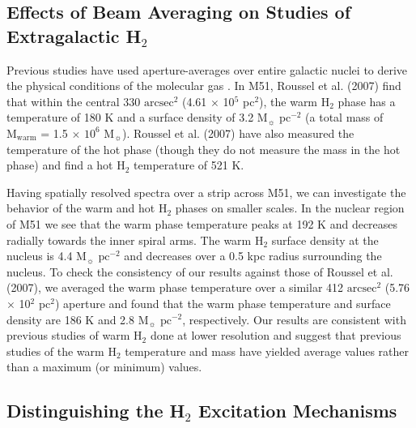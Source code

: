 \documentclass[12pt,preprint]{aastex}
\begin{document}
\subsection{Effects of Beam Averaging on Studies of Extragalactic H$_2$}

Previous studies have used aperture-averages over entire galactic
nuclei to derive the physical conditions of the molecular gas
\citep{rig02, hig06, rou07}.  In M51, Roussel et al. (2007) find that within
the central 330 $\mathrm{arcsec^2}$ (4.61 $\times$ 10$^5$ pc$^2$),
the warm H$_2$ phase has a temperature of 180 K and 
a surface density of 3.2 $\mathrm{M_\sun}$ $\mathrm{pc^{-2}}$ 
(a total mass of $\mathrm{M_{warm}}$ = 1.5 $\times$ $\mathrm{10^6}$
$\mathrm{M_\sun}$).  Roussel et al. (2007) have also measured the temperature of
the hot phase (though they do not measure the mass in the hot phase)
and find a hot H$_2$ temperature of 521 K.

Having spatially resolved spectra over a strip across M51, we can 
investigate the behavior of the warm and hot H$_2$ phases 
on smaller scales.  In the nuclear region of M51 we see that the 
warm phase temperature peaks at 192 K and decreases 
radially towards the inner spiral arms.  The warm H$_2$ surface 
density at the nucleus is 4.4 $\mathrm{M_\sun}$ $\mathrm{pc^{-2}}$ 
and decreases over a 0.5 kpc radius surrounding the 
nucleus.  To check the consistency of 
our results against those of Roussel et al. (2007), we averaged the 
warm phase temperature over a similar 412 
$\mathrm{arcsec^2}$ (5.76 $\times$ 10$^2$ pc$^2$) aperture and
found that the warm phase temperature and surface density are
186 K and 2.8 $\mathrm{M_\sun}$ $\mathrm{pc^{-2}}$, 
respectively.  Our results are consistent with previous studies of 
warm H$_2$ done at lower resolution and suggest that 
previous studies of the warm H$_2$ temperature and 
mass have yielded average values rather than a maximum (or minimum) values.

\subsection{Distinguishing the H$_2$ Excitation Mechanisms}
\end{document}
